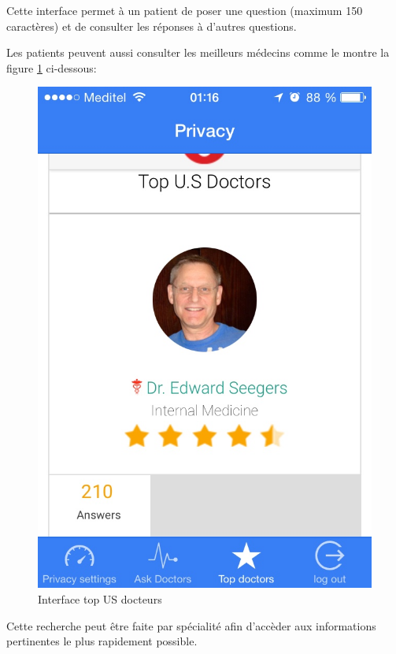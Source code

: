 Cette interface permet à un patient de poser une question (maximum 150 caractères) et de consulter les réponses à d'autres questions.

\newpage

Les patients peuvent aussi consulter les meilleurs médecins comme le montre la figure \ref{top} ci-dessous:

\begin{figure}[!ht]
\begin{center}
\includegraphics[scale=0.3]{top.jpg}
\caption{Interface top US docteurs}
\label{top}
\end{center}
\end{figure}

Cette recherche peut être faite par spécialité afin d'accèder aux informations pertinentes le plus rapidement possible.

